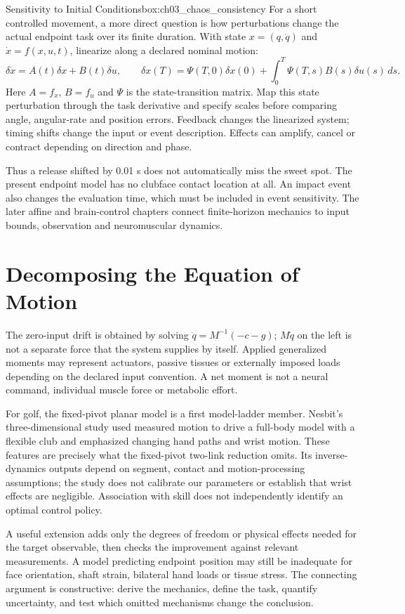 \begin{laymansbox}{Sensitivity to Initial Conditions}{box:ch03_chaos_consistency}
For a short controlled movement, a more direct question is how perturbations change the actual endpoint task over its finite duration. With state $x=(q,\dot q)$ and $\dot x=f(x,u,t)$, linearize along a declared nominal motion:
\[
\delta\dot x=A(t)\delta x+B(t)\delta u,\qquad
\delta x(T)=\Psi(T,0)\delta x(0)+\int_0^T\Psi(T,s)B(s)\delta u(s)\,ds.
\]
Here $A=f_x$, $B=f_u$ and $\Psi$ is the state-transition matrix. Map this state perturbation through the task derivative and specify scales before comparing angle, angular-rate and position errors. Feedback changes the linearized system; timing shifts change the input or event description. Effects can amplify, cancel or contract depending on direction and phase.

Thus a release shifted by 0.01 s does not automatically miss the sweet spot. The present endpoint model has no clubface contact location at all. An impact event also changes the evaluation time, which must be included in event sensitivity. The later affine and brain-control chapters connect finite-horizon mechanics to input bounds, observation and neuromuscular dynamics.
\end{laymansbox}

\section{Decomposing the Equation of Motion}
The zero-input drift is obtained by solving $\ddot q=M^{-1}(-c-g)$; $M\ddot q$ on the left is not a separate force that the system supplies by itself. Applied generalized moments may represent actuators, passive tissues or externally imposed loads depending on the declared input convention. A net moment is not a neural command, individual muscle force or metabolic effort.

For golf, the fixed-pivot planar model is a first model-ladder member. Nesbit's three-dimensional study used measured motion to drive a full-body model with a flexible club and emphasized changing hand paths and wrist motion. These features are precisely what the fixed-pivot two-link reduction omits. Its inverse-dynamics outputs depend on segment, contact and motion-processing assumptions; the study does not calibrate our parameters or establish that wrist effects are negligible. Association with skill does not independently identify an optimal control policy. \citep{Nesbit2005}

A useful extension adds only the degrees of freedom or physical effects needed for the target observable, then checks the improvement against relevant measurements. A model predicting endpoint position may still be inadequate for face orientation, shaft strain, bilateral hand loads or tissue stress. The connecting argument is constructive: derive the mechanics, define the task, quantify uncertainty, and test which omitted mechanisms change the conclusion.

